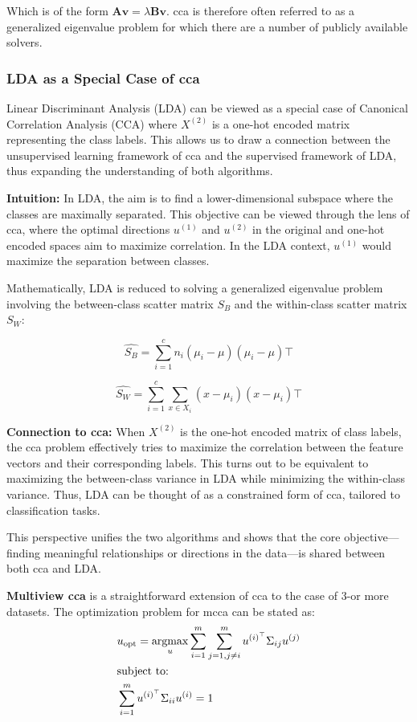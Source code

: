 Which is of the form $\mathbf{A v} = \lambda \mathbf{B v}$. \acrshort{cca} is therefore often referred to as a generalized eigenvalue problem for which there are a number of publicly available solvers.

\subsubsection{LDA as a Special Case of \acrshort{cca}}

Linear Discriminant Analysis (LDA) can be viewed as a special case of Canonical Correlation Analysis (CCA) where \(X^{(2)}\) is a one-hot encoded matrix representing the class labels.
This allows us to draw a connection between the unsupervised learning framework of \acrshort{cca} and the supervised framework of LDA, thus expanding the understanding of both algorithms.

\textbf{Intuition:} In LDA, the aim is to find a lower-dimensional subspace where the classes are maximally separated. This objective can be viewed through the lens of \acrshort{cca}, where the optimal directions \(u^{(1)}\) and \(u^{(2)}\) in the original and one-hot encoded spaces aim to maximize correlation. In the LDA context, \(u^{(1)}\) would maximize the separation between classes.

Mathematically, LDA is reduced to solving a generalized eigenvalue problem involving the between-class scatter matrix \(S_B\) and the within-class scatter matrix \(S_W\):

\[
    \hat{S_B} = \sum_{i=1}^{c} n_i (\mu_i - \mu)(\mu_i - \mu)\top
\]

\[
    \hat{S_W} = \sum_{i=1}^{c} \sum_{x \in X_i} (x - \mu_i)(x - \mu_i)\top
\]

\textbf{Connection to \acrshort{cca}:} When \(X^{(2)}\) is the one-hot encoded matrix of class labels, the \acrshort{cca} problem effectively tries to maximize the correlation between the feature vectors and their corresponding labels.
This turns out to be equivalent to maximizing the between-class variance in LDA while minimizing the within-class variance.
Thus, LDA can be thought of as a constrained form of \acrshort{cca}, tailored to classification tasks.

This perspective unifies the two algorithms and shows that the core objective—finding meaningful relationships or directions in the data—is shared between both \acrshort{cca} and LDA.

\textbf{Multiview \acrshort{cca}} is a straightforward extension of \acrshort{cca} to the case of 3-or more datasets.
The optimization problem for \acrshort{mcca} can be stated as:
\begin{align}
     & u_{\text{opt}} = \underset{u}{\mathrm{argmax}} \sum_{i=1}^{m} \sum_{j=1, j \neq i}^{m} u^{(i)^{\top}} \Sigma_{ij} u^{(j)} \\
     & \text{subject to:} \notag                                                                                               \\
     & \sum_{i=1}^{m} u^{(i)^{\top}} \Sigma_{ii} u^{(i)} = 1 \notag
\end{align}

